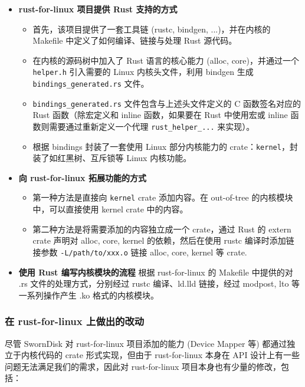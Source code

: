 \begin{itemize}
  \item \textbf{rust-for-linux 项目提供 Rust 支持的方式}
  \begin{itemize}
    \item 首先，该项目提供了一套工具链 (rustc, bindgen, ...)，并在内核的 Makefile 中定义了如何编译、链接与处理 Rust 源代码。
    \item 在内核的源码树中加入了 Rust 语言的核心能力 (alloc, core)，并通过一个 \texttt{helper.h} 引入需要的 Linux 内核头文件，利用 bindgen 生成 \texttt{bindings_generated.rs} 文件。
    \item \texttt{bindings_generated.rs} 文件包含与上述头文件定义的 C 函数签名对应的 Rust 函数（除宏定义和 inline 函数，如果要在 Rust 中使用宏或 inline 函数则需要通过重新定义一个代理 \texttt{rust_helper_...} 来实现）。
    \item 根据 bindings 封装了一套使用 Linux 部分内核能力的 crate：\texttt{kernel}，封装了如红黑树、互斥锁等 Linux 内核功能。
  \end{itemize}

  \item \textbf{向 rust-for-linux 拓展功能的方式}
  \begin{itemize}
    \item 第一种方法是直接向 \texttt{kernel} crate 添加内容。在 out-of-tree 的内核模块中，可以直接使用 kernel crate 中的内容。
    \item 第二种方法是将需要添加的内容独立成一个 crate，通过 Rust 的 extern crate 声明对 alloc, core, kernel 的依赖，然后在使用 rustc 编译时添加链接参数 \texttt{-L/path/to/xxx.o} 链接 alloc, core, kernel 等 crate.
  \end{itemize}

  \item \textbf{使用 Rust 编写内核模块的流程} \quad 根据 rust-for-linux 的 Makefile 中提供的对 .rs 文件的处理方式，分别经过 rustc 编译、ld.lld 链接，经过 modpost, lto 等一系列操作产生 .ko 格式的内核模块。
\end{itemize}

\subsubsection{在 rust-for-linux 上做出的改动}

尽管 SwornDisk 对 rust-for-linux 项目添加的能力 (Device Mapper 等) 都通过独立于内核代码的 crate 形式实现，但由于 rust-for-linux 本身在 API 设计上有一些问题无法满足我们的需求，因此对 rust-for-linux 项目本身也有少量的修改，包括：


